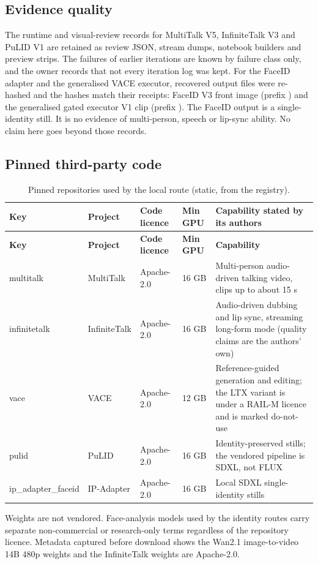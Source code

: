 \documentclass[11pt,a4paper]{article}
\newcommand{\code}[1]{\texttt{\detokenize{#1}}}
\begin{document}
\subsection{Evidence quality}
The runtime and visual-review records for MultiTalk V5, InfiniteTalk V3 and PuLID V1 are retained as review JSON, stream dumps, notebook builders and preview strips. The failures of earlier iterations are known by failure class only, and the owner records that not every iteration log was kept. For the FaceID adapter and the generalised VACE executor, recovered output files were re-hashed and the hashes match their receipts: FaceID V3 front image (prefix \code{7edc4dfa}) and the generalised gated executor V1 clip (prefix \code{64e5b7ee}). The FaceID output is a single-identity still. It is no evidence of multi-person, speech or lip-sync ability. No claim here goes beyond those records.

\subsection{Pinned third-party code}
\begin{longtable}{@{}P{2.3cm}P{3.0cm}P{2.2cm}P{1.8cm}P{6.2cm}@{}}
\caption{Pinned repositories used by the local route (static, from the registry).}\\
\toprule \textbf{Key} & \textbf{Project} & \textbf{Code licence} & \textbf{Min GPU} & \textbf{Capability stated by its authors}\\ \midrule\endfirsthead
\toprule \textbf{Key} & \textbf{Project} & \textbf{Code licence} & \textbf{Min GPU} & \textbf{Capability}\\ \midrule\endhead
multitalk & MultiTalk & Apache-2.0 & 16 GB & Multi-person audio-driven talking video, clips up to about 15 s\\
infinitetalk & InfiniteTalk & Apache-2.0 & 16 GB & Audio-driven dubbing and lip sync, streaming long-form mode (quality claims are the authors' own)\\
vace & VACE & Apache-2.0 & 12 GB & Reference-guided generation and editing; the LTX variant is under a RAIL-M licence and is marked do-not-use\\
pulid & PuLID & Apache-2.0 & 16 GB & Identity-preserved stills; the vendored pipeline is SDXL, not FLUX\\
ip\_adapter\allowbreak\_faceid & IP-Adapter & Apache-2.0 & 16 GB & Local SDXL single-identity stills\\
\bottomrule
\end{longtable}
Weights are not vendored. Face-analysis models used by the identity routes carry separate non-commercial or research-only terms regardless of the repository licence. Metadata captured before download shows the Wan2.1 image-to-video 14B 480p weights and the InfiniteTalk weights are Apache-2.0.
\end{document}
